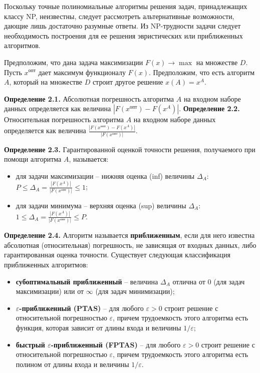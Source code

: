 \documentclass[a4paper,12pt]{article}
\begin{document}
Поскольку точные полиномиальные алгоритмы решения задач, принадлежащих классу NP, неизвестны, следует рассмотреть альтернативные возможности, дающие лишь достаточно разумные ответы. Из NP-трудности задачи следует необходимость построения для ее решения эвристических или приближенных алгоритмов.

Предположим, что дана задача максимизации \(F(x) \to \max\) на множестве \(D\). Пусть \(x^{\text{опт}}\) дает максимум функционалу \(F(x)\). Предположим, что есть алгоритм \(A\), который на множестве \(D\) строит другое решение \(x(A) = x^A\). 

\textbf{Определение 2.1.} Абсолютная погрешность алгоритма \(A\) на входном наборе данных определяется как величина \(|F(x^{\text{опт}}) - F(x^A)|\).
\textbf{Определение 2.2.} Относительная погрешность алгоритма \(A\) на входном наборе данных определяется как величина \(\frac{|F(x^{\text{опт}}) - F(x^A)|}{|F(x^{\text{опт}})|}\).

\textbf{Определение 2.3.} Гарантированной оценкой точности решения, получаемого при помощи алгоритма \(A\), называется:
\begin{itemize}
    \item для задачи максимизации – нижняя оценка (inf) величины \(\Delta_A\): \(P \le \Delta_A = \frac{|F(x^A)|}{|F(x^{\text{опт}})|} \le 1\);
    \item для задачи минимума – верхняя оценка (sup) величины \(\Delta_A\): \(1 \le \Delta_A = \frac{|F(x^A)|}{|F(x^{\text{опт}})|} \le P\).
\end{itemize}

\textbf{Определение 2.4.} Алгоритм называется \textbf{приближенным}, если для него известна абсолютная (относительная) погрешность, не зависящая от входных данных, либо гарантированная оценка точности. Существует следующая классификация приближенных алгоритмов:
\begin{itemize}
    \item \textbf{субоптимальный приближенный} – величина \(\Delta_A\) отлична от 0 (для задач максимизации) или от \(\infty\) (для задач минимизации);
    \item \textbf{\(\varepsilon\)-приближенный (PTAS)} – для любого \(\varepsilon > 0\) строит решение с относительной погрешностью \(\varepsilon\), причем трудоемкость этого алгоритма есть функция, которая зависит от длины входа и величины \(1/\varepsilon\);
    \item \textbf{быстрый \(\varepsilon\)-приближенный (FPTAS)} – для любого \(\varepsilon > 0\) строит решение с относительной погрешностью \(\varepsilon\), причем трудоемкость этого алгоритма есть полином от длины входа и величины \(1/\varepsilon\).
\end{itemize}
\end{document}
